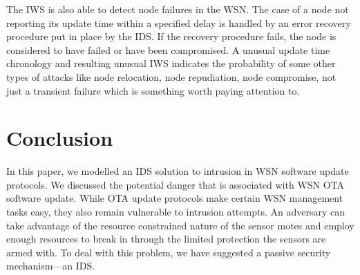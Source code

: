 \documentclass[conference,manuscript]{IEEEtran}
\newcommand{\notedme}[1]{\raisebox{0pt}[0pt][0pt]{\pdfcomment[open=true,color=blue]{#1}}}
\begin{document}
The IWS is also able to detect node failures in the WSN.
The case of a node not reporting its update time within a specified delay is handled by an error recovery procedure put in place by the IDS.
If the recovery procedure fails, the node is considered to have failed or have been compromised.
A unusual update time chronology and resulting unusual IWS  indicates the probability of some other types of attacks like node relocation, node repudiation, node compromise, not just a transient failure which is something worth paying attention to.


\section{Conclusion}
\label{sec:concl}

In this paper, we modelled an IDS solution to intrusion in WSN software update protocols.
We discussed the potential danger that is associated with WSN OTA software update.
While OTA update protocols make certain WSN management tasks easy, they also remain vulnerable to intrusion attempts.
An adversary can take advantage of the resource constrained nature of the sensor motes and employ enough resources to break in through the limited protection the sensors are armed with.
To deal with this problem, we have suggested a passive security mechanism---an IDS.
\end{document}
